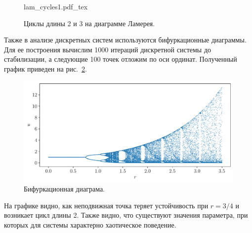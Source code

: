\documentclass[12pt, a4paper]{article} %
\newcommand{\incfig}[1]{%
    \def\svgwidth{\columnwidth}
    {#1.pdf_tex}
}
\begin{document}
\begin{figure}[ht]
    \centering
    \incfig{lam_cycles1}
    \caption{Циклы длины 2 и 3 на диаграмме Ламерея.}
    \label{fig:lam_cycles1}
\end{figure}

Также в анализе дискретных систем используются бифуркационные диаграммы.
Для ее построения вычислим 1000 итераций дискретной системы до стабилизации, а следующие 100 точек отложим по оси ординат.
Полученный график приведен на рис.~\ref{fig:bifurc1}.

\begin{figure}[ht]
    \centering
    \includegraphics[width=\textwidth]{figures/bifurc1.pdf}
    \caption{Бифуркационная диаграма.}
    \label{fig:bifurc1}
\end{figure}

На графике видно, как неподвижная точка теряет устойчивость при $r=3\!/4$ и возникает цикл длины 2. 
Также видно, что существуют значения параметра, при которых для системы характерно хаотическое поведение.




 
\end{document}
